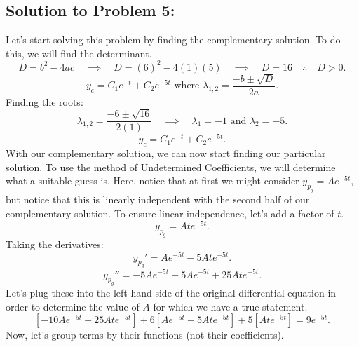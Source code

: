 \documentclass[a4paper,12pt]{article} %
\begin{document}
\subsection*{Solution to Problem 5:}
Let's start solving this problem by finding the complementary solution. To do this, we will find the determinant.
$$ D = b^2 -4ac \quad\implies\quad D = (6)^2 -4(1)(5) \quad\implies\quad D=16 \quad\therefore\quad D>0. $$
$$ y_c = C_1e^{-t} + C_2e^{-5t} \text{ where } \lambda_{1,2} = \frac{-b \pm \sqrt{D}}{2a}.$$
Finding the roots:
$$ \lambda_{1,2} = \frac{-6 \pm \sqrt{16}}{2(1)} \quad\implies\quad \lambda_1 = -1 \text{ and } \lambda_2 = -5. $$
$$ y_c = C_1e^{-t} + C_2e^{-5t}. $$
With our complementary solution, we can now start finding our particular solution. To use the method of Undetermined Coefficients, we will determine what a suitable guess is. Here, notice that at first we might consider $y_{p_g} = Ae^{-5t}$, but notice that this is linearly independent with the second half of our complementary solution. To ensure linear independence, let's add a factor of $t$.
$$ y_{p_g} = Ate^{-5t}. $$
Taking the derivatives:
$$ y_{p_g}' = Ae^{-5t} - 5Ate^{-5t}. $$
$$ y_{p_g}'' = -5Ae^{-5t} - 5Ae^{-5t} + 25Ate^{-5t}. $$
Let's plug these into the left-hand side of the original differential equation in order to determine the value of $A$ for which we have a true statement.
$$ \left[-10Ae^{-5t} + 25Ate^{-5t}\right] + 6\left[Ae^{-5t} - 5Ate^{-5t}\right] + 5\left[Ate^{-5t}\right] = 9e^{-5t}. $$
Now, let's group terms by their functions (not their coefficients).
\end{document}
